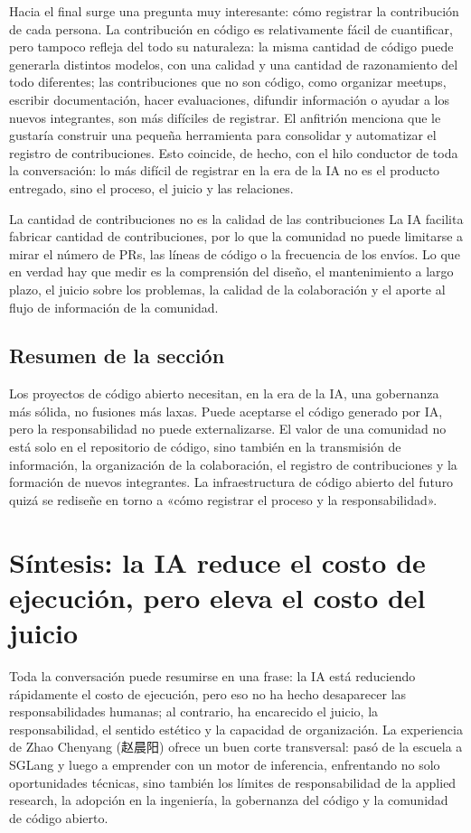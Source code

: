 \documentclass[a4paper]{article}
\begin{document}
Hacia el final surge una pregunta muy interesante: cómo registrar la contribución de cada persona. La contribución en código es relativamente fácil de cuantificar, pero tampoco refleja del todo su naturaleza: la misma cantidad de código puede generarla distintos modelos, con una calidad y una cantidad de razonamiento del todo diferentes; las contribuciones que no son código, como organizar meetups, escribir documentación, hacer evaluaciones, difundir información o ayudar a los nuevos integrantes, son más difíciles de registrar. El anfitrión menciona que le gustaría construir una pequeña herramienta para consolidar y automatizar el registro de contribuciones. Esto coincide, de hecho, con el hilo conductor de toda la conversación: lo más difícil de registrar en la era de la IA no es el producto entregado, sino el proceso, el juicio y las relaciones.

\begin{warningbox}{La cantidad de contribuciones no es la calidad de las contribuciones}
La IA facilita fabricar cantidad de contribuciones, por lo que la comunidad no puede limitarse a mirar el número de PRs, las líneas de código o la frecuencia de los envíos. Lo que en verdad hay que medir es la comprensión del diseño, el mantenimiento a largo plazo, el juicio sobre los problemas, la calidad de la colaboración y el aporte al flujo de información de la comunidad.
\end{warningbox}

\subsection{Resumen de la sección}

Los proyectos de código abierto necesitan, en la era de la IA, una gobernanza más sólida, no fusiones más laxas. Puede aceptarse el código generado por IA, pero la responsabilidad no puede externalizarse. El valor de una comunidad no está solo en el repositorio de código, sino también en la transmisión de información, la organización de la colaboración, el registro de contribuciones y la formación de nuevos integrantes. La infraestructura de código abierto del futuro quizá se rediseñe en torno a «cómo registrar el proceso y la responsabilidad».
\section{Síntesis: la IA reduce el costo de ejecución, pero eleva el costo del juicio}

Toda la conversación puede resumirse en una frase: la IA está reduciendo rápidamente el costo de ejecución, pero eso no ha hecho desaparecer las responsabilidades humanas; al contrario, ha encarecido el juicio, la responsabilidad, el sentido estético y la capacidad de organización. La experiencia de Zhao Chenyang (赵晨阳) ofrece un buen corte transversal: pasó de la escuela a SGLang y luego a emprender con un motor de inferencia, enfrentando no solo oportunidades técnicas, sino también los límites de responsabilidad de la applied research, la adopción en la ingeniería, la gobernanza del código y la comunidad de código abierto.
\end{document}

